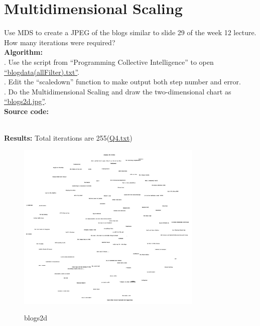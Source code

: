 \documentclass{article}
\begin{document}
		\section{Multidimensional Scaling}
		Use MDS to create a JPEG of the blogs similar to slide 29 of the week 12 lecture. How many iterations were required?\\

		\noindent\textbf{Algorithm:}\\
		. Use the script from ``Programming Collective Intelligence'' to open \href{https://github.com/zhangboroy/cs532-s17/blob/master/assg08_submission/blogdata(allFilter).txt}{``blogdata(allFilter).txt''}.\\
		. Edit the ``scaledown'' function to make output both step number and error.\\
		. Do the Multidimensional Scaling and draw the two-dimensional chart as \href{https://github.com/zhangboroy/cs532-s17/blob/master/assg08_submission/blogs2d.jpg}{``blogs2d.jpg''}.\\

		\noindent\textbf{Source code:}
		

		\noindent\\\textbf{Results: }Total iterations are 255(\href{https://github.com/zhangboroy/cs532-s17/blob/master/assg08_submission/Q4.txt}{Q4.txt})\\
		\begin{figure}[!htb]
			\centering 
			\href{https://github.com/zhangboroy/cs532-s17/blob/master/assg08_submission/blogs2d.jpg}
			{\includegraphics[width=0.79\textwidth]{blogs2d.jpg}}
			\label{fig:blogs2d}
			\caption{blogs2d}
		\end{figure}
\end{document}
